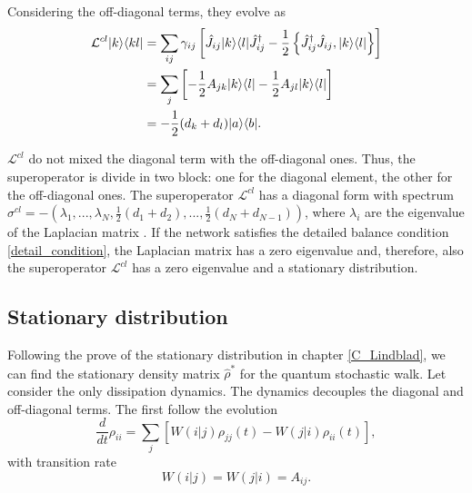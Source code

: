 Considering the off-diagonal terms, they evolve as 
\begin{equation}
    \begin{split}
        \mathcal{L}^{cl}\lvert k\rangle\langle kl\rvert &= \sum_{ij}\gamma_{ij}\left[\hat J_{ij} \lvert k\rangle\langle l\rvert\hat J_{ij}^\dagger -\frac{1}{2} \left\{ \hat J_{ij}^\dagger \hat J_{ij}, \lvert k\rangle\langle l\rvert\right\}\right]\\
        &= \sum_{j}\left[-\frac{1}{2} A_{jk}\lvert k\rangle\langle l\rvert - \frac{1}{2} A_{jl}\lvert k\rangle\langle l\rvert\right]\\
        &= - \frac{1}{2}(d_k + d_l)\lvert a\rangle\langle b\rvert.
    \end{split} 
\end{equation}

$\mathcal{L}^{cl}$ do not mixed the diagonal term with the off-diagonal ones. Thus, the superoperator is divide in two block: one for the diagonal element, the other for the off-diagonal ones.
The superoperator $\mathcal{L}^{cl}$ has a diagonal form with spectrum $\sigma^{cl} = -(\lambda_1,...,\lambda_N,\frac{1}{2}(d_1 + d_2),...,\frac{1}{2}(d_N + d_{N-1}))$, where $\lambda_i$ are the eigenvalue of the Laplacian matrix \cite{Bruderer_Plenio}.
If the network satisfies the detailed balance condition \eqref{detail_condition}, the Laplacian matrix has a zero eigenvalue and, therefore, also the superoperator $\mathcal{L}^{cl}$ has a zero eigenvalue and a stationary distribution.


\subsection{Stationary distribution}

Following the prove of the stationary distribution in chapter \ref{C_Lindblad}, we can find the stationary density matrix $\hat\rho^*$ for the quantum stochastic walk.
Let consider the only dissipation dynamics.
The dynamics decouples the diagonal and off-diagonal terms. The first follow the evolution 
\begin{equation}
    \frac{d}{dt}\rho_{ii} = \sum_j\left[W(i|j)\rho_{jj}(t) - W(j|i)\rho_{ii}(t)\right],
\end{equation}
with transition rate
\begin{equation}
    W(i|j) = W(j|i) = A_{ij}.
\end{equation}

